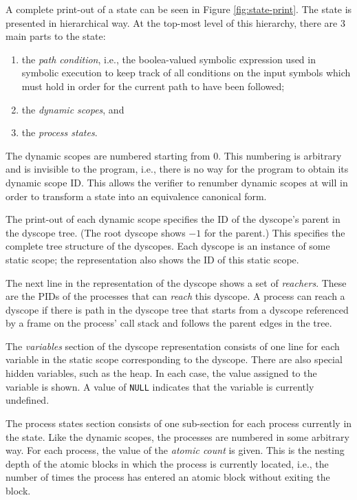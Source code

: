 A complete print-out of a state can be seen in Figure
\ref{fig:state-print}.  The state is presented in hierarchical way.
At the top-most level of this hierarchy, there are 3 main parts to the
state:
\begin{enumerate}
\item the \emph{path condition}, i.e., the boolea-valued symbolic
  expression used in symbolic execution to keep track of all
  conditions on the input symbols which must hold in order for the
  current path to have been followed;
\item the \emph{dynamic scopes}, and
\item the \emph{process states}.
\end{enumerate}

The dynamic scopes are numbered starting from 0.  This numbering is
arbitrary and is invisible to the program, i.e., there is no way for
the program to obtain its dynamic scope ID.  This allows the verifier
to renumber dynamic scopes at will in order to transform a state into
an equivalence canonical form.

The print-out of each dynamic scope specifies the ID of the dyscope's
parent in the dyscope tree.  (The root dyscope shows $-1$ for the
parent.)  This specifies the complete tree structure of the dyscopes.
Each dyscope is an instance of some static scope; the representation
also shows the ID of this static scope.

The next line in the representation of the dyscope shows a set of
\emph{reachers}.  These are the PIDs of the processes that can
\emph{reach} this dyscope.  A process can reach a dyscope if there is
path in the dyscope tree that starts from a dyscope referenced by a
frame on the process' call stack and follows the parent edges in the
tree.

The \emph{variables} section of the dyscope representation consists of
one line for each variable in the static scope corresponding to the
dyscope.  There are also special hidden variables, such as the heap.
In each case, the value assigned to the variable is shown.  A value of
\texttt{NULL} indicates that the variable is currently undefined.

The process states section consists of one sub-section for each
process currently in the state.  Like the dynamic scopes, the
processes are numbered in some arbitrary way. For each process, the
value of the \emph{atomic count} is given.  This is the nesting depth
of the atomic blocks in which the process is currently located, i.e.,
the number of times the process has entered an atomic block without
exiting the block.

